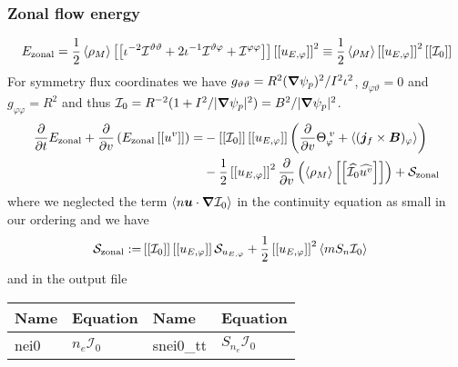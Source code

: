 \subsubsection{Zonal flow energy}
\begin{align}
    E_\mathrm{zonal} = \frac{1}{2}\left \langle \rho_M \right \rangle\left[\left[  \iota^{-2}\mathcal I^{\vartheta\vartheta} + 2\iota^{-1}\mathcal I^{\vartheta\varphi} + \mathcal I^{\varphi\varphi} \right]\right] \left[\left[ u_{E,\varphi} \right]\right]^2
    \equiv \frac{1}{2} \left \langle \rho_M \right \rangle \left[\left[ u_{E,\varphi} \right]\right]^2  \left[\left[ \mathcal I_0 \right]\right]
    \label{eq:zonal_energy}
\end{align}
For symmetry flux coordinates we have $g_{\vartheta\vartheta} = R^2 ({\boldsymbol{\nabla}}\psi_p)^2/I^2\iota^2$, $g_{\varphi\vartheta} =0$ and $g_{\varphi\varphi}=R^2$ and thus $\mathcal I_0 = R^{-2}( 1 + I^2/|{\boldsymbol{\nabla}}\psi_p|^2)= B^2 / |{\boldsymbol{\nabla}}\psi_p|^2$.
\begin{align}\label{eq:perp_kinetic}
      \frac{\partial}{\partial t}E_{\mathrm{zonal}} +\frac{\partial}{\partial v } \left(E_{\mathrm{zonal}}\left[\left[ u^v \right]\right] \right)
  =&-\left[\left[ \mathcal I_0 \right]\right]\left[\left[ u_{E,\varphi} \right]\right]\left(\frac{\partial }{\partial v}  \Theta_{\varphi}^{\; v} + \left \langle ({\boldsymbol{j}}_f\times{\boldsymbol{B}})_\varphi \right \rangle\right)
  \nonumber\\
    &-\frac{1}{2}\left[\left[ u_{E,\varphi} \right]\right]^2\frac{\partial}{\partial v}\left(\left \langle \rho_M \right \rangle\left[\left[ \widehat{\mathcal I_0}\widehat{u^v} \right]\right]\right)
     + \mathcal S_{\mathrm{zonal}}
\end{align}
where we neglected the term $\left \langle n{\boldsymbol{u}}\cdot{\boldsymbol{\nabla}} \mathcal I_0 \right \rangle$ in the continuity equation as small in our ordering
 and we have
 \begin{align}
 \mathcal S_{\mathrm{zonal}} :=& \left[\left[ \mathcal I_0 \right]\right] \left[\left[ u_{E,\varphi} \right]\right] \mathcal S_{u_{E,\varphi}} + \frac{1}{2}\left[\left[ u_{E,\varphi} \right]\right]^2  \left \langle mS_n\mathcal I_0 \right \rangle
 \label{eq:zonal_source}
 \end{align}
 and in the output file
\begin{longtable}{llll}
\toprule
\rowcolor{gray!50}\textbf{Name} &  \textbf{Equation} &
\textbf{Name} &  \textbf{Equation}\\
\midrule
    nei0 &$n_e \mathcal I_0$ &
    snei0\_tt & $S_{n_e } \mathcal I_0$ \\
\bottomrule
\end{longtable}

